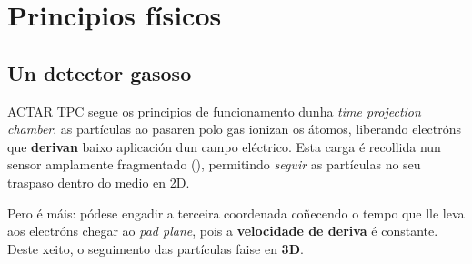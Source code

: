 \documentclass[11pt, a4paper]{article}
\begin{document}
\section{Principios físicos}
\subsection{Un detector gasoso}
ACTAR TPC segue os principios de funcionamento dunha \textit{time projection chamber}: as partículas ao pasaren polo gas ionizan os átomos, liberando electróns que \textbf{derivan} baixo aplicación dun campo eléctrico. Esta carga é recollida nun sensor amplamente fragmentado (), permitindo \textit{seguir} as partículas no seu traspaso dentro do medio en 2D.

Pero é máis: pódese engadir a terceira coordenada coñecendo o tempo que lle leva aos electróns chegar ao \textit{pad plane}, pois a \textbf{velocidade de deriva} é constante. Deste xeito, o seguimento das partículas faise en \textbf{3D}.
\end{document}
